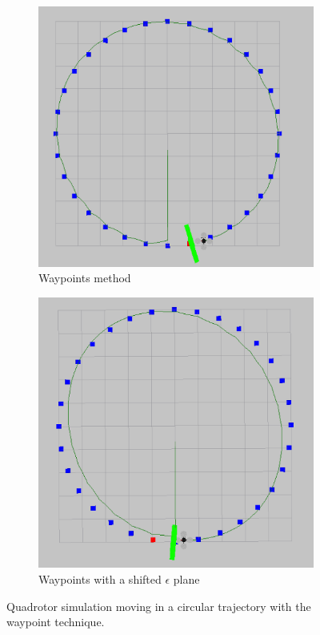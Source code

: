 \documentclass[hidelinks,BTech]{iitmdiss}
\begin{document}
\begin{figure}[H]
  \centering
  \begin{subfigure}[t]{0.45\textwidth}
    \centering
      \includegraphics[width=\textwidth]{Waypoints.png}
      \caption{Waypoints method}
  \end{subfigure}
  \begin{subfigure}[t]{0.45\textwidth}
    \centering
      \includegraphics[width=\textwidth]{Waypoints_0_9.png}
      \caption{Waypoints with a shifted $\epsilon$ plane}
  \end{subfigure}
  \caption{Quadrotor simulation moving in a circular trajectory with the waypoint technique.}
\end{figure}
\end{document}
